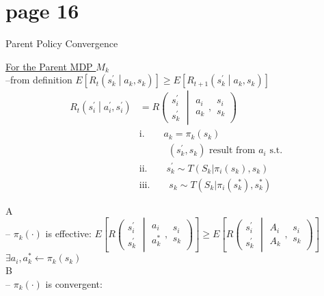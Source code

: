 \section*{page 16}

\begin{center}
Parent Policy Convergence
\end{center}

\underline{For the Parent MDP $M_k$}\\

--from definition $E\left[ R_t \left( s^\prime_k \middle| a_k, s_k \right) \right] \ge E\left[ R_{t+1}\left( s^\prime_k \middle| a_k, s_k  \right) \right]$\\
\begin{align*}
R_t\left( s^\prime_i \middle| a^\prime_i, s^\prime_i \right) & = R\left( \begin{array}{c} s^\prime_i \\ s^\prime_k \end{array} \middle| 
\begin{array}{c}a_i \\ a_k \end{array}, \begin{array}{c} s_i \\ s_k \end{array} \right)\\
& \text{i.}\qquad a_k = \pi_k( s_k )\\
& \qquad\quad ( s^\prime_k, s_k ) \text{\ result from\ }a_i\text{\ s.t.\ }\\
&\text{ii.}\qquad s^\prime_k \sim T( S_k | \pi_i( s_k ), s_k )\\
&\text{iii.}\qquad s_k \sim T( S_k | \pi_i( s^\ast_k ), s^\ast_k )
\end{align*}

\textcircled{A}\\
\boxed{$\textasteriskcentered$} -- $\pi_k(\cdot)$ is effective: $E\left[ R\left( \begin{array}{c} s^\prime_i \\ s^\prime_k \end{array} \middle| \begin{array}{c} a_i \\ a^\ast_k \end{array}, \begin{array}{c} s_i \\ s_k \end{array} \right) \right] 
\ge E\left[ R\left( \begin{array}{c} s^\prime_i \\ s^\prime_k \end{array} \middle| \begin{array}{c} A_i \\ A_k \end{array}, \begin{array}{c} s_i \\ s_k \end{array} \right) \right]$\\
\qquad\qquad$\exists a_i, a^\ast_k\leftarrow\pi_k(s_k)$\\

\textcircled{B}\\
\boxed{$\textasteriskcentered$} -- $\pi_k(\cdot)$ is convergent:


